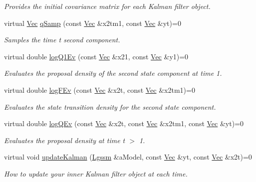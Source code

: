 \begin{DoxyCompactItemize}
\begin{DoxyCompactList}\small\item\em Provides the initial covariance matrix for each Kalman filter object. \end{DoxyCompactList}\item 
virtual \hyperlink{apf__filter_8h_a4c7df05c6f5e8a0d15ae14bcdbc07152}{Vec} \hyperlink{classKalman__RBPF__SISR_aaf7a8d99e04ef6a4d0a86bcbf46c21f5}{q\+Samp} (const \hyperlink{apf__filter_8h_a4c7df05c6f5e8a0d15ae14bcdbc07152}{Vec} \&x2tm1, const \hyperlink{apf__filter_8h_a4c7df05c6f5e8a0d15ae14bcdbc07152}{Vec} \&yt)=0
\begin{DoxyCompactList}\small\item\em Samples the time t second component. \end{DoxyCompactList}\item 
virtual double \hyperlink{classKalman__RBPF__SISR_afaef322b375a4f01b216339e15b36db8}{log\+Q1\+Ev} (const \hyperlink{apf__filter_8h_a4c7df05c6f5e8a0d15ae14bcdbc07152}{Vec} \&x21, const \hyperlink{apf__filter_8h_a4c7df05c6f5e8a0d15ae14bcdbc07152}{Vec} \&y1)=0
\begin{DoxyCompactList}\small\item\em Evaluates the proposal density of the second state component at time 1. \end{DoxyCompactList}\item 
virtual double \hyperlink{classKalman__RBPF__SISR_a9aa5b265d3dd00da1768a23a5038ff80}{log\+F\+Ev} (const \hyperlink{apf__filter_8h_a4c7df05c6f5e8a0d15ae14bcdbc07152}{Vec} \&x2t, const \hyperlink{apf__filter_8h_a4c7df05c6f5e8a0d15ae14bcdbc07152}{Vec} \&x2tm1)=0
\begin{DoxyCompactList}\small\item\em Evaluates the state transition density for the second state component. \end{DoxyCompactList}\item 
virtual double \hyperlink{classKalman__RBPF__SISR_afde7f3bf1457d7796725b7acb88b50c3}{log\+Q\+Ev} (const \hyperlink{apf__filter_8h_a4c7df05c6f5e8a0d15ae14bcdbc07152}{Vec} \&x2t, const \hyperlink{apf__filter_8h_a4c7df05c6f5e8a0d15ae14bcdbc07152}{Vec} \&x2tm1, const \hyperlink{apf__filter_8h_a4c7df05c6f5e8a0d15ae14bcdbc07152}{Vec} \&yt)=0
\begin{DoxyCompactList}\small\item\em Evaluates the proposal density at time t $>$ 1. \end{DoxyCompactList}\item 
virtual void \hyperlink{classKalman__RBPF__SISR_ab8b1bde42a4354e7b0b5912c797ef838}{update\+Kalman} (\hyperlink{classLgssm}{Lgssm} \&a\+Model, const \hyperlink{apf__filter_8h_a4c7df05c6f5e8a0d15ae14bcdbc07152}{Vec} \&yt, const \hyperlink{apf__filter_8h_a4c7df05c6f5e8a0d15ae14bcdbc07152}{Vec} \&x2t)=0
\begin{DoxyCompactList}\small\item\em How to update your inner Kalman filter object at each time. \end{DoxyCompactList}\end{DoxyCompactItemize}


